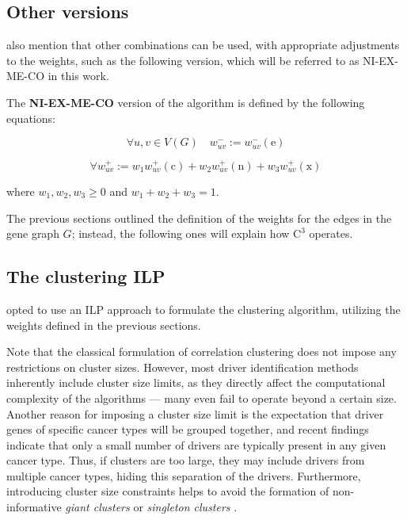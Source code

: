 \subsection{Other versions}

\textcite{c3} also mention that other combinations can be used, with appropriate adjustments to the weights, such as the following version, which will be referred to as NI-EX-ME-CO in this work.

\begin{definition}[NI-EX-ME-CO]
    The \textbf{NI-EX-ME-CO} version of the algorithm is defined by the following equations:

    \begin{equation}
        \forall u, v \in V(G) \quad w_{uv}^- := w_{uv}^-(\mathrm e)
    \end{equation}

    \begin{equation}
        \forall w_{uv}^+ := w_1 w_{uv}^+(\mathrm c) + w_2 w_{uv}^+(\mathrm n) + w_3 w_{uv}^+(\mathrm x)
    \end{equation}

    where $w_1, w_2, w_3 \ge 0$ and $w_1 + w_2 + w_3 = 1$.
\end{definition}

The previous sections outlined the definition of the weights for the edges in the gene graph $G$; instead, the following ones will explain how $\mathrm{C}^3$ operates.

\subsection{The clustering ILP} \label{the_clustering_ilp}

\textcite{c3} opted to use an ILP approach to formulate the clustering algorithm, utilizing the weights defined in the previous sections.

Note that the classical formulation of correlation clustering does not impose any restrictions on cluster sizes. However, most driver identification methods inherently include cluster size limits, as they directly affect the computational complexity of the algorithms --- many even fail to operate beyond a certain size. Another reason for imposing a cluster size limit is the expectation that driver genes of specific cancer types will be grouped together, and recent findings indicate that only a small number of drivers are typically present in any given cancer type. Thus, if clusters are too large, they may include drivers from multiple cancer types, hiding this separation of the drivers. Furthermore, introducing cluster size constraints helps to avoid the formation of non-informative \textit{giant clusters} or \textit{singleton clusters} \cite{c3}.

